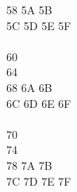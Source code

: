 \documentclass[letterpaper,10pt,openright,twoside,onecolumn]{book}
\begin{document}
\begin{tabbing}
    58 \> 	 \> 	\> 5A \> 	\> 5B \> 	\\
    5C \> 	\> 5D \> 	\> 5E \> 	\> 5F \> 	\\
    \\
    60 \> 	 \> 	 \> 	 \> 	\\
    64 \> 	 \> 	 \> 	 \> 	\\
    68 \> 	 \> 	\> 6A \> 	\> 6B \> 	\\
    6C \> 	\> 6D \> 	\> 6E \> 	\> 6F \> 	\\
    \\
    70 \> 	 \> 	 \> 	 \> 	\\
    74 \> 	 \> 	 \> 	 \> 	\\
    78 \> 	 \> 	\> 7A \> 	\> 7B \> 	\\
    7C \> 	\> 7D \> 	\> 7E \> 	\> 7F \> 	\\
  \end{tabbing}
\end{document}
